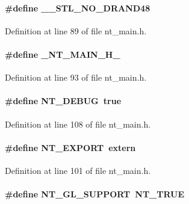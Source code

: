 \paragraph[{\_\-\_\-STL\_\-NO\_\-DRAND48}]{\setlength{\rightskip}{0pt plus 5cm}\#define \_\-\_\-STL\_\-NO\_\-DRAND48}\hfill\label{nt__main_8h_afa1a65dadb55963ef9a0b85d77a7aecb}


Definition at line 89 of file nt\_\-main.h.

\paragraph[{\_\-NT\_\-MAIN\_\-H\_\-}]{\setlength{\rightskip}{0pt plus 5cm}\#define \_\-NT\_\-MAIN\_\-H\_\-}\hfill\label{nt__main_8h_a633bcda463a7c5a90f37c124574bc97a}


Definition at line 93 of file nt\_\-main.h.

\paragraph[{NT\_\-DEBUG}]{\setlength{\rightskip}{0pt plus 5cm}\#define NT\_\-DEBUG~true}\hfill\label{nt__main_8h_a5eb1ed356007ebc95c88708bf5fea6f5}


Definition at line 108 of file nt\_\-main.h.

\paragraph[{NT\_\-EXPORT}]{\setlength{\rightskip}{0pt plus 5cm}\#define NT\_\-EXPORT~extern}\hfill\label{nt__main_8h_a0a447b643d0827e88a76e090d01486b4}


Definition at line 101 of file nt\_\-main.h.

\paragraph[{NT\_\-GL\_\-SUPPORT}]{\setlength{\rightskip}{0pt plus 5cm}\#define NT\_\-GL\_\-SUPPORT~{\bf NT\_\-TRUE}}\hfill\label{nt__main_8h_a2d4fd0aed3fa1192371441b7b41b38ae}


